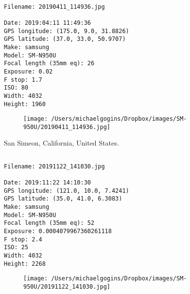 \documentclass[11pt,letter,DIV=14,paper=landscape]{scrbook}
\begin{document}
\clearpage
\noindent 
\noindent
\begin{lstlisting}

Filename: 20190411_114936.jpg

Date: 2019:04:11 11:49:36
GPS longitude: (175.0, 9.0, 31.8826)
GPS latitude: (37.0, 33.0, 50.9707)
Make: samsung
Model: SM-N950U
Focal length (35mm eq): 26
Exposure: 0.02
F stop: 1.7
ISO: 80
Width: 4032
Height: 1960
\end{lstlisting}
\clearpage

\begin{figure}
\texttt{[image: /Users/michaelgogins/Dropbox/images/SM-950U/20190411\_114936.jpg]}
\end{figure}
    
\clearpage
\noindent San Simeon, California, United States.
\noindent
\begin{lstlisting}

Filename: 20191122_141030.jpg

Date: 2019:11:22 14:10:30
GPS longitude: (121.0, 10.0, 7.4241)
GPS latitude: (35.0, 41.0, 6.3083)
Make: samsung
Model: SM-N950U
Focal length (35mm eq): 52
Exposure: 0.0004079967360261118
F stop: 2.4
ISO: 25
Width: 4032
Height: 2268
\end{lstlisting}
\clearpage

\begin{figure}
\texttt{[image: /Users/michaelgogins/Dropbox/images/SM-950U/20191122\_141030.jpg]}
\end{figure}
\fi
\end{document}
